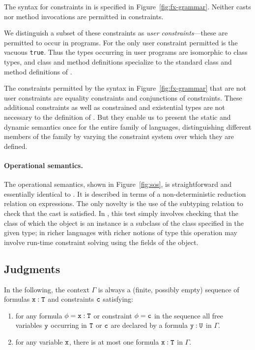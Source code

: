 The syntax for constraints in \FXZ{} is specified in
Figure~\ref{fig:fx-grammar}. Neither casts nor method
invocations are permitted in constraints.

We distinguish a subset of these constraints as
{\em user constraints}---these are permitted to occur in
programs. For \FXZ{} the only user constraint permitted is the vacuous
{\tt true}. Thus the types occurring in user programs are isomorphic
to class types, and class and method definitions specialize to the
standard class and method definitions of \FJ{}. 

The constraints permitted by the syntax in
Figure~\ref{fig:fx-grammar} that
are not user constraints are equality constraints and
conjunctions of constraints. These additional
constraints as well as constrained and existential types
are not necessary to the definition of \FXZ.
But they enable us to present the static and dynamic
semantics once for the entire family of \FX{} languages,
distinguishing different members of the family by varying the
constraint system over which they are defined.


\paragraph{Operational semantics.}

The operational semantics, shown in Figure~\ref{fig:sos},
is straightforward and essentially identical
to \FJ \cite{FJ}. It is described in terms of a non-deterministic
reduction relation on expressions. The only novelty is the use of the
subtyping relation to check that the cast is satisfied. In \FXZ, this
test simply involves checking that the class of which the object is an
instance is a subclass of the class specified in the given type; in
richer languages with richer notions of type this operation may
involve run-time constraint solving using the fields of the object.


\subsection{Judgments}

In the following, the context $\Gamma$ is always a
(finite, possibly empty) sequence of formulas $\tt x:T$ and constraints $\tt c$ satisfying:
\begin{enumerate}
  \item for any formula $\phi=\tt x:T$ or constraint $\phi=\tt c$ in the sequence all free variables $\tt y$
  occurring in $\tt T$ or $\tt c$ are declared by a formula $\tt
  y:U$ in $\Gamma$.

  \item for any variable $\tt x$, there is at most one
  formula $\tt x:T$ in $\Gamma$.
\end{enumerate}

